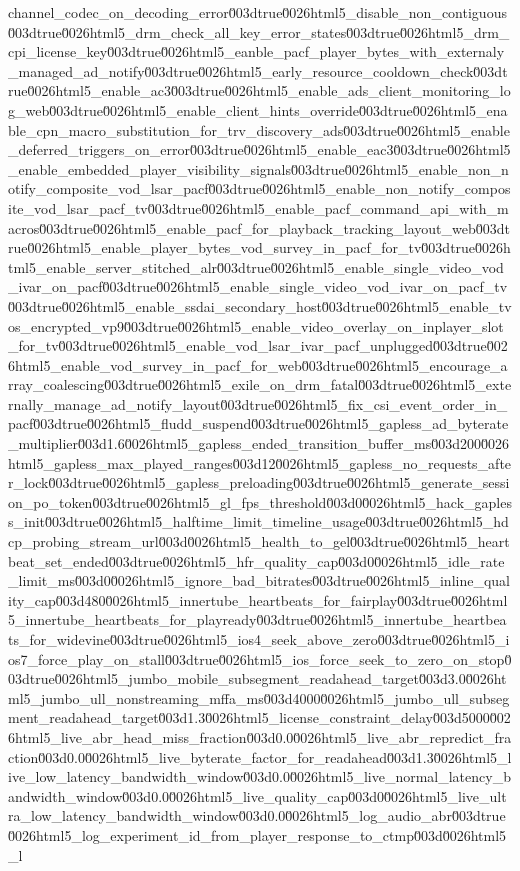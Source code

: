 {channel_codec_on_decoding_error\u003dtrue\u0026html5_disable_non_contiguous\u003dtrue\u0026html5_drm_check_all_key_error_states\u003dtrue\u0026html5_drm_cpi_license_key\u003dtrue\u0026html5_eanble_pacf_player_bytes_with_externaly_managed_ad_notify\u003dtrue\u0026html5_early_resource_cooldown_check\u003dtrue\u0026html5_enable_ac3\u003dtrue\u0026html5_enable_ads_client_monitoring_log_web\u003dtrue\u0026html5_enable_client_hints_override\u003dtrue\u0026html5_enable_cpn_macro_substitution_for_trv_discovery_ads\u003dtrue\u0026html5_enable_deferred_triggers_on_error\u003dtrue\u0026html5_enable_eac3\u003dtrue\u0026html5_enable_embedded_player_visibility_signals\u003dtrue\u0026html5_enable_non_notify_composite_vod_lsar_pacf\u003dtrue\u0026html5_enable_non_notify_composite_vod_lsar_pacf_tv\u003dtrue\u0026html5_enable_pacf_command_api_with_macros\u003dtrue\u0026html5_enable_pacf_for_playback_tracking_layout_web\u003dtrue\u0026html5_enable_player_bytes_vod_survey_in_pacf_for_tv\u003dtrue\u0026html5_enable_server_stitched_alr\u003dtrue\u0026html5_enable_single_video_vod_ivar_on_pacf\u003dtrue\u0026html5_enable_single_video_vod_ivar_on_pacf_tv\u003dtrue\u0026html5_enable_ssdai_secondary_host\u003dtrue\u0026html5_enable_tvos_encrypted_vp9\u003dtrue\u0026html5_enable_video_overlay_on_inplayer_slot_for_tv\u003dtrue\u0026html5_enable_vod_lsar_ivar_pacf_unplugged\u003dtrue\u0026html5_enable_vod_survey_in_pacf_for_web\u003dtrue\u0026html5_encourage_array_coalescing\u003dtrue\u0026html5_exile_on_drm_fatal\u003dtrue\u0026html5_externally_manage_ad_notify_layout\u003dtrue\u0026html5_fix_csi_event_order_in_pacf\u003dtrue\u0026html5_fludd_suspend\u003dtrue\u0026html5_gapless_ad_byterate_multiplier\u003d1.6\u0026html5_gapless_ended_transition_buffer_ms\u003d200\u0026html5_gapless_max_played_ranges\u003d12\u0026html5_gapless_no_requests_after_lock\u003dtrue\u0026html5_gapless_preloading\u003dtrue\u0026html5_generate_session_po_token\u003dtrue\u0026html5_gl_fps_threshold\u003d0\u0026html5_hack_gapless_init\u003dtrue\u0026html5_halftime_limit_timeline_usage\u003dtrue\u0026html5_hdcp_probing_stream_url\u003d\u0026html5_health_to_gel\u003dtrue\u0026html5_heartbeat_set_ended\u003dtrue\u0026html5_hfr_quality_cap\u003d0\u0026html5_idle_rate_limit_ms\u003d0\u0026html5_ignore_bad_bitrates\u003dtrue\u0026html5_inline_quality_cap\u003d480\u0026html5_innertube_heartbeats_for_fairplay\u003dtrue\u0026html5_innertube_heartbeats_for_playready\u003dtrue\u0026html5_innertube_heartbeats_for_widevine\u003dtrue\u0026html5_ios4_seek_above_zero\u003dtrue\u0026html5_ios7_force_play_on_stall\u003dtrue\u0026html5_ios_force_seek_to_zero_on_stop\u003dtrue\u0026html5_jumbo_mobile_subsegment_readahead_target\u003d3.0\u0026html5_jumbo_ull_nonstreaming_mffa_ms\u003d4000\u0026html5_jumbo_ull_subsegment_readahead_target\u003d1.3\u0026html5_license_constraint_delay\u003d5000\u0026html5_live_abr_head_miss_fraction\u003d0.0\u0026html5_live_abr_repredict_fraction\u003d0.0\u0026html5_live_byterate_factor_for_readahead\u003d1.3\u0026html5_live_low_latency_bandwidth_window\u003d0.0\u0026html5_live_normal_latency_bandwidth_window\u003d0.0\u0026html5_live_quality_cap\u003d0\u0026html5_live_ultra_low_latency_bandwidth_window\u003d0.0\u0026html5_log_audio_abr\u003dtrue\u0026html5_log_experiment_id_from_player_response_to_ctmp\u003d\u0026html5_l}

